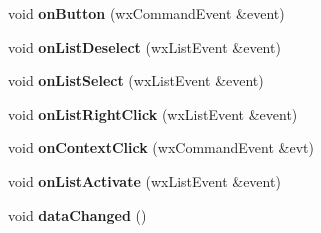 \begin{DoxyCompactItemize}
\item 
\hypertarget{struct_list_tab_a0c24b27f20cdb38e0eb673245f7c0542}{void {\bfseries on\-Button} (wx\-Command\-Event \&event)}\label{struct_list_tab_a0c24b27f20cdb38e0eb673245f7c0542}

\item 
\hypertarget{struct_list_tab_ad2dfddbd6e0083f682a5689cc5411352}{void {\bfseries on\-List\-Deselect} (wx\-List\-Event \&event)}\label{struct_list_tab_ad2dfddbd6e0083f682a5689cc5411352}

\item 
\hypertarget{struct_list_tab_adadc2db079b8ad23165040e50ad77831}{void {\bfseries on\-List\-Select} (wx\-List\-Event \&event)}\label{struct_list_tab_adadc2db079b8ad23165040e50ad77831}

\item 
\hypertarget{struct_list_tab_ac062d6e7b531ad8ec65a9ad307ea7022}{void {\bfseries on\-List\-Right\-Click} (wx\-List\-Event \&event)}\label{struct_list_tab_ac062d6e7b531ad8ec65a9ad307ea7022}

\item 
\hypertarget{struct_list_tab_a65e30fb2ab50bc4a324dec7a0a8a5014}{void {\bfseries on\-Context\-Click} (wx\-Command\-Event \&evt)}\label{struct_list_tab_a65e30fb2ab50bc4a324dec7a0a8a5014}

\item 
\hypertarget{struct_list_tab_a7adba5f85eb8d87734efe27efd40c5ca}{void {\bfseries on\-List\-Activate} (wx\-List\-Event \&event)}\label{struct_list_tab_a7adba5f85eb8d87734efe27efd40c5ca}

\item 
\hypertarget{struct_list_tab_a05044166fa2e690c3f17a71f2e27121f}{void {\bfseries data\-Changed} ()}\label{struct_list_tab_a05044166fa2e690c3f17a71f2e27121f}

\end{DoxyCompactItemize}
